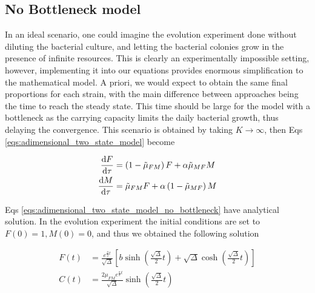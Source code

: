 \documentclass[10pt,a4paper]{scrartcl}
\begin{document}



\subsection{No Bottleneck model}
In an ideal scenario, one could imagine the evolution experiment done without diluting the bacterial culture, and letting the bacterial colonies grow in the presence of infinite resources. This is clearly an experimentally impossible setting, however, implementing it into our equations provides enormous simplification to the mathematical model. A priori, we would expect to obtain the same final proportions for each strain, with the main difference between approaches being the time to reach the steady state. This time should be large for the model with a bottleneck as the carrying capacity limits the daily bacterial growth, thus delaying the convergence. This scenario is obtained by taking $K\rightarrow \infty$, then Eqs \ref{eqs:adimensional_two_state_model} become 

\begin{subequations}\label{eqs:adimensional_two_state_model_no_bottleneck}
\begin{align}
\dv{F}{\tau} &= \left(1 - \Tilde{\mu}_{FM}\right)F + \alpha \Tilde{\mu}_{MF} M \\
\dv{M}{\tau} &= \Tilde{\mu}_{FM} F + \alpha\left(1 - \Tilde{\mu}_{MF}\right)M
\end{align}
\end{subequations}

Eqs \ref{eqs:adimensional_two_state_model_no_bottleneck} have analytical solution. In the evolution experiment the initial conditions are set to $F(0) = 1, M(0) = 0$, and thus we obtained the following solution

\begin{subequations}\label{eq:solution_two_state_no_bottleneck}
\begin{align}
F(t) &= \frac{e^{\frac{a}{2}t}}{\sqrt{\Delta}}\left[  b\sinh\left(\frac{\sqrt{\Delta}}{2}t \right ) + \sqrt{\Delta}\cosh\left(\frac{\sqrt{\Delta}}{2}t \right )\right ]\\ 
C(t) &= \frac{2\mu_{FM}e^{\frac{a}{2}t}}{\sqrt{\Delta}}\sinh\left(\frac{\sqrt{\Delta}}{2}t \right )
\end{align}
\end{subequations}
\end{document}
